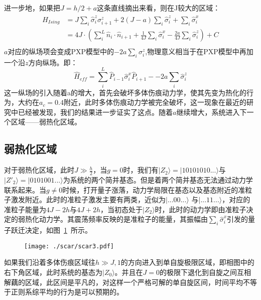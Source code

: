 进一步地，如果把$J=h/2+a$这条直线摘出来看，则在J较大的区域：
\begin{equation}
\begin{split}
\hat{H}_{Ising}&= J\sum_{i}\hat{\sigma}^z_i\sigma^z_{i+1} + 2(J-a)\sum_{i}\hat{\sigma}^z_i + \sum_i\hat{\sigma}^x_i \\
\quad &= 4J\cdot( \sum_{i}^{L} \hat{n}_i\cdot\hat{n}_{i+1} + \frac{1}{4J}\sum_i\hat{\sigma}^x_i - \frac{2a}{4J} \sum_{i}\hat{\sigma}^z_i  ) + C\\
\end{split}
\end{equation}
$a$对应的纵场项会变成PXP模型中的$-2a\sum_i\sigma^z_i$,物理意义相当于在PXP模型中再加一个沿$z$方向纵场。即：
\begin{equation}
\hat{H}_{eff} = \sum_{i}^{L} \hat{P}_{i-1}\hat{\sigma}_i^x\hat{P}_{i+1} -  -2a\sum_i\hat{\sigma}^z_i 
\end{equation}
这一纵场的引入随着a的增大，首先会破坏多体伤痕动力学，使其先变为热化的行为，大约在$a_c=0.4$附近，此时多体伤痕动力学被完全破坏，这一现象在最近的研究中已经被发现\cite{Yao2022quantum}，我们的结果进一步证实了这点。随着$a$继续增大，系统进入下一个区域——弱热化区域。

\subsection{弱热化区域}
对于弱热化区域，此时$J \gg \frac{h}{2}$，当$g=0$时，我们有$|Z_2\rangle=|10101010...\rangle$与$|Z'_{2}\rangle=|0101001...\rangle$为系统的两个简并基态。但是着两个简并基态无法通过动力学联系起来。当$g\neq 0$时候，打开量子涨落，动力学局限在基态以及基态附近的准粒子激发附近。此时的准粒子激发主要有两类，近似为$|...00...\rangle$
与$|...11...\rangle$，对应的准粒子能量为$4J-2h$与$4J+2h$，当初态处于$|Z_2\rangle$时，此时的动力学即由准粒子决定的弱热化动力学。其震荡频率反映的是准粒子的能量，其振幅由$\sum_i \hat{\sigma}_i^x$引发的量子跃迁决定，如图~\ref{weak}~所示。

\begin{figure}[h]
\centering
\texttt{[image: ./scar/scar3.pdf]}
\label{weak}
\end{figure}
如果我们沿着多体伤痕区域往$h \gg J,1$的方向进入到单自旋极限区域，即相图中的右下角区域，此时系统的基态为$|Z_0\rangle$。并且在$J=0$的极限下退化到自旋之间互相解藕的区域，此区间是平凡的，对这样一个严格可解的单自旋区间，时间平均不等于正则系综平均的行为是可以预期的。

